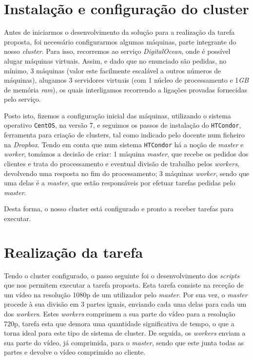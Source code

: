 \documentclass[a4paper]{report}
\begin{document}
    \section{Instalação e configuração do cluster}
	Antes de iniciarmos o desenvolvimento da solução para a realização da tarefa proposta, foi necessário configurarmos algumas máquinas, parte integrante do nosso \textit{cluster}. Para isso, recorremos ao serviço \textit{DigitalOcean}, onde é possível alugar máquinas virtuais. Assim, e dado que no enunciado são pedidas, no mínimo, 3 máquinas (valor este facilmente escalável a outros números de máquinas), alugamos 3 servidores virtuais (com 1 núcleo de processamento e 1\textit{GB} de memória \textit{ram}), os quais interligamos recorrendo a ligações provadas fornecidas pelo serviço.
	
	Posto isto, fizemos a configuração inicial das máquinas, utilizando o sistema operativo \texttt{CentOS}, na versão 7, e seguimos os passos de instalação do \texttt{HTCondor}, ferramenta para criação de clusters, tal como indicado pelo docente num ficheiro na \textit{Dropbox}.
	Tendo em conta que num sistema \texttt{HTCondor} há a noção de \textit{master} e \textit{worker}, tomámos a decisão de criar: 1 máquina \textit{master}, que recebe os pedidos dos clientes e trata do processamento e eventual divisão de trabalho pelos \textit{workers}, devolvendo uma resposta no fim do processamento; 3 máquinas \textit{worker}, sendo que uma delas é a \textit{master}, que estão responsáveis por efetuar tarefas pedidas pelo \textit{master}.
	
	Desta forma, o nosso cluster está configurado e pronto a receber tarefas para executar.
    
    \section{Realização da tarefa}
    Tendo o cluster configurado, o passo seguinte foi o desenvolvimento dos \textit{scripts} que nos permitem executar a tarefa proposta. Esta tarefa consiste na receção de um vídeo na resolução 1080p de um utilizador pelo \textit{master}. Por sua vez, o \textit{master} procede à sua divisão em 3 partes iguais, enviando cada uma delas para cada um dos \textit{workers}. Estes \textit{workers} comprimem a sua parte do vídeo para a resolução 720p, tarefa esta que demora uma quantidade significativa de tempo, o que a torna ideal para este tipo de sistema de cluster. De seguida, os \textit{workers} enviam a sua parte do vídeo, já comprimida, para o \textit{master}, sendo que este junta todas as partes e devolve o vídeo comprimido ao cliente.
    
\end{document}
